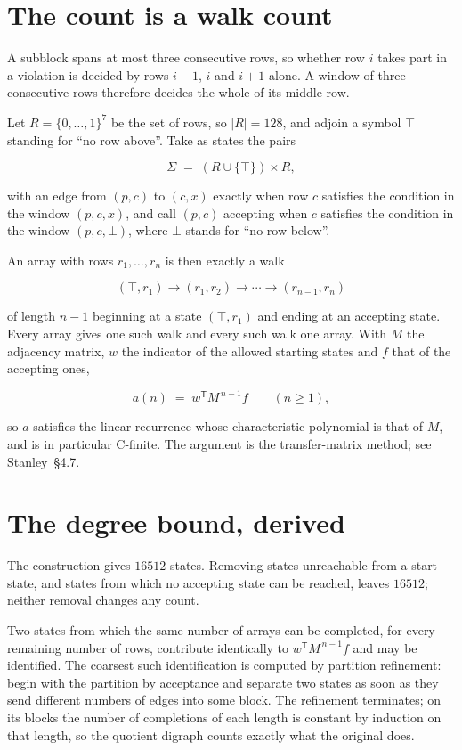 \documentclass[11pt]{article}
\theoremstyle{definition}
\begin{document}
\section{The count is a walk count}

A subblock spans at most three consecutive rows, so whether row $i$ takes part in a violation is decided by rows $i-1$, $i$ and $i+1$ alone. A window of three consecutive rows therefore decides the whole of its middle row.

Let $R = \{0,\dots,1\}^{7}$ be the set of rows, so $|R| = 128$, and adjoin a symbol $\top$ standing for ``no row above''. Take as states the pairs

\[\Sigma \;=\; (R \cup \{\top\}) \times R,\]

with an edge from $(p,c)$ to $(c,x)$ exactly when row $c$ satisfies the condition in the window $(p,c,x)$, and call $(p,c)$ accepting when $c$ satisfies the condition in the window $(p,c,\bot)$, where $\bot$ stands for ``no row below''.

An array with rows $r_1,\dots,r_n$ is then exactly a walk

\[(\top,r_1) \to (r_1,r_2) \to \cdots \to (r_{n-1},r_n)\]

of length $n-1$ beginning at a state $(\top,r_1)$ and ending at an accepting state. Every array gives one such walk and every such walk one array. With $M$ the adjacency matrix, $w$ the indicator of the allowed starting states and $f$ that of the accepting ones,

\[a(n) \;=\; w^{\mathsf T} M^{\,n-1} f \qquad (n \ge 1),\]

so $a$ satisfies the linear recurrence whose characteristic polynomial is that of $M$, and is in particular C-finite. The argument is the transfer-matrix method; see Stanley~\S4.7.

\section{The degree bound, derived}

The construction gives $16512$ states. Removing states unreachable from a start state, and states from which no accepting state can be reached, leaves $16512$; neither removal changes any count.

Two states from which the same number of arrays can be completed, for every remaining number of rows, contribute identically to $w^{\mathsf T}M^{\,n-1}f$ and may be identified. The coarsest such identification is computed by partition refinement: begin with the partition by acceptance and separate two states as soon as they send different numbers of edges into some block. The refinement terminates; on its blocks the number of completions of each length is constant by induction on that length, so the quotient digraph counts exactly what the original does.
\end{document}

